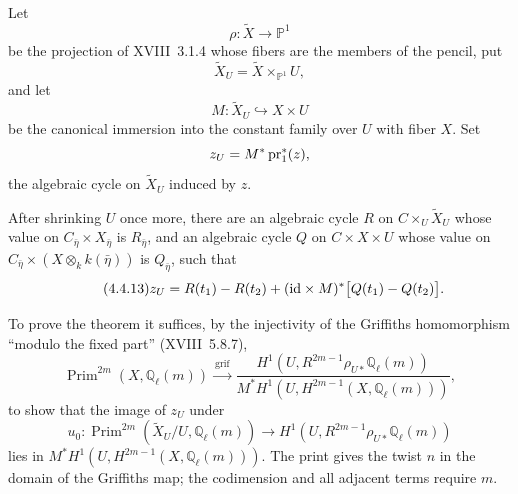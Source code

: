 Let
\begin{equation*}
\rho:\widetilde X\longrightarrow\mathbb P^1
\end{equation*}
be the projection of XVIII~3.1.4 whose fibers are the members of the
pencil, put
\begin{equation*}
\widetilde X_U=\widetilde X\times_{\mathbb P^1}U,
\end{equation*}
and let
\begin{equation*}
M:\widetilde X_U\hookrightarrow X\times U
\end{equation*}
be the canonical immersion into the constant family over $U$ with fiber
$X$.  Set
\begin{equation*}
z_U=M^*\operatorname{pr}_1^*(z),
\end{equation*}
the algebraic cycle on $\widetilde X_U$ induced by $z$.

After shrinking $U$ once more, there are an algebraic cycle $R$ on
$C\times_U\widetilde X_U$ whose value on
$C_{\bar\eta}\times X_{\bar\eta}$ is $R_{\bar\eta}$, and an algebraic
cycle $Q$ on $C\times X\times U$ whose value on
$C_{\bar\eta}\times(X\otimes_k k(\bar\eta))$ is $Q_{\bar\eta}$, such
that
\begin{equation}\tag{4.4.13}
z_U=R(t_1)-R(t_2)
+(\mathrm{id}\times M)^*\bigl[Q(t_1)-Q(t_2)\bigr].
\end{equation}

To prove the theorem it suffices, by the injectivity of the Griffiths
homomorphism ``modulo the fixed part'' (XVIII~5.8.7),
\begin{equation*}
\operatorname{Prim}^{2m}(X,\mathbb Q_\ell(m))
\xrightarrow{\ \operatorname{grif}\ }
\frac{H^1(U,R^{2m-1}\rho_{U*}\mathbb Q_\ell(m))}
{M^*H^1(U,H^{2m-1}(X,\mathbb Q_\ell(m)))},
\end{equation*}
to show that the image of $z_U$ under
\begin{equation*}
u_0:\operatorname{Prim}^{2m}(\widetilde X_U/U,\mathbb Q_\ell(m))
\longrightarrow H^1(U,R^{2m-1}\rho_{U*}\mathbb Q_\ell(m))
\end{equation*}
lies in
$M^*H^1(U,H^{2m-1}(X,\mathbb Q_\ell(m)))$.
The print gives the twist $n$ in the domain of the Griffiths map; the
codimension and all adjacent terms require $m$.

